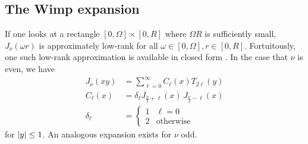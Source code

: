\subsection{The Wimp expansion}
\label{sec:local}


If one looks at a rectangle $[0, \Omega] \times [0, R]$ where $\Omega R$ is
sufficiently small, $J_\nu(\omega r)$ is approximately low-rank for all $\omega
\in [0, \Omega], r \in [0, R]$. Fortuitously, one such low-rank approximation is
available in closed form \cite{wimp1962polynomial}. In the case that $\nu$ is
even, we have
\begin{align}
    J_\nu(xy) 
    &= \sum_{\ell=0}^\infty C_\ell(x) T_{2\ell}(y) \\
    C_\ell(x) 
    &= \delta_\ell J_{\frac{\nu}{2} + \ell}(x) \, J_{\frac{\nu}{2} - \ell}(x) \\
    \delta_\ell 
    &= \begin{cases}
        1 & \ell=0 \\
        2 & \text{otherwise}
    \end{cases}
\end{align}
for $\left|y\right| \leq 1$. An analogous expansion exists for $\nu$ odd.

